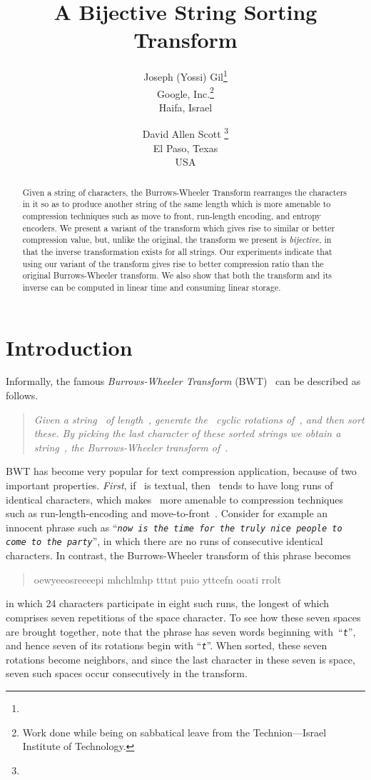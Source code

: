 \documentclass[a4paper,12pt]{article}
\title{A Bijective String Sorting Transform}
\author{Joseph (Yossi) Gil\footnote{\str{yogi@cs.Technion.ac.IL}} \\
        Google, Inc.\footnote{Work done while being on sabbatical leave
			       from the Technion---Israel Institute of Technology.} \\
        Haifa, Israel
	\and
	David Allen Scott \footnote{\str{David\_a\_Scott@email.com}} \\
        El Paso, Texas\\
        USA
}
\newcommand{\str}[1]{{\textit{\texttt{#1}}}}
\numberwithin{algorithm}{section}
\begin{document}
\maketitle

\begin{abstract}
Given a string of characters, the Burrows-Wheeler Transform
  rearranges the characters in it so as to produce another string
  of the same length which
  is more amenable to compression techniques such as move to
  front, run-length encoding, and entropy encoders.
We present a variant of the transform
  which gives rise to similar or better compression value,
  but, unlike the original, the transform we present is
  \emph{bijective}, in that the inverse transformation
  exists for all strings.
Our experiments indicate that using our variant of the transform
  gives rise to better compression ratio than the original Burrows-Wheeler
  transform.
We also show that both the transform and its inverse can be computed
  in linear time and consuming linear storage.
\end{abstract}

\section{Introduction}
Informally, the famous \emph{Burrows-Wheeler Transform} (BWT)~\cite{Burrows:Wheeler:94}
  can be described as follows.
\begin{quote}
\sl Given a string~ of length~, generate the~  cyclic rotations
  of~, and then sort these.
By picking the last character of these sorted strings we obtain
  a string~,
  the Burrows-Wheeler transform of~.
\end{quote}
BWT has become very popular for text
   compression application, because of two important properties.
\emph{First}, if~ is textual, then~ tends to have long runs of identical characters,
   which makes~ more amenable to compression techniques such as run-length-encoding
   and move-to-front~\cite{Bentley:Sleator:Tarjan:Wei:86}.
Consider for example an innocent phrase such as
  “\str{now is the time for the truly nice people to come to the party}'',
  in which there are no runs of consecutive identical characters.
In contrast, the Burrows-Wheeler transform of this phrase becomes
\begin{quote}
\begin{verbatim*}
oewyeeosreeeepi mhchlmhp tttnt puio yttcefn  ooati       rrolt
\end{verbatim*}
\end{quote}
in which 24 characters participate in eight such runs, the longest of which comprises seven repetitions of the space character.
To see how these seven spaces are brought together, note that  the  phrase
  has seven words beginning with~“\str{t}'', and hence seven
  of its rotations begin with “\str{t}''.
When sorted, these seven rotations become neighbors, and since the last character
   in these seven is space, seven such spaces occur consecutively in the transform.
\end{document}
